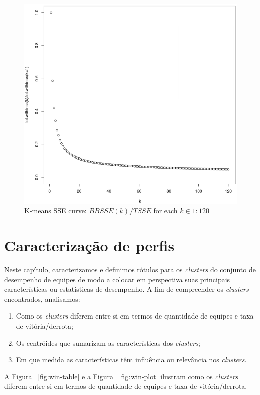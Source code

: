 \begin{figure}
  \centering
  \includegraphics[width=1.0\textwidth]{k-means-curve}%
  \caption{K-means SSE curve: $BBSSE(k)/TSSE$   for each  $k \in {1:120}$}
  \label{fig:k-means-curve}
\end{figure}

\chapter{Caracterização de perfis}

Neste capítulo, caracterizamos e definimos rótulos para os \textit{clusters} do conjunto de desempenho de equipes de modo a colocar em perspectiva suas principais características ou estatísticas de desempenho. A fim de compreender os \textit{clusters} encontrados, analisamos:

\begin{enumerate}[label=(\roman*)]
 \item Como os \textit{clusters} diferem entre si em termos de quantidade de equipes e taxa de vitória/derrota;
 \item Os centróides que sumarizam as características dos \textit{clusters};
 \item Em que medida as características têm influência ou relevância nos \textit{clusters}.
\end{enumerate}

A Figura ~\ref{fig:win-table} e a Figura ~\ref{fig:win-plot} ilustram como os \textit{clusters} diferem entre si em termos de quantidade de equipes e taxa de vitória/derrota.

